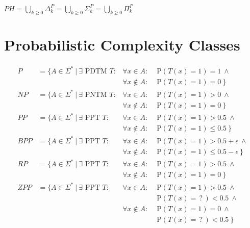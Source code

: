 \documentclass[
    13pt,
    oneside,
    a4paper,
    numbers=enddot,
    abstractoff,
    parskip=full
]{scrreprt}
\begin{document}
$ PH = \bigcup_{k \geq 0} \Delta^P_{k}
     = \bigcup_{k \geq 0} \Sigma^P_{k}
     = \bigcup_{k \geq 0} \Pi^P_{k} $




\section*{Probabilistic Complexity Classes}
\label{sec:probabilistic_complexity_classes}


\begin{align*}
    P & = \{
    A \in \Sigma^\ast ~|~
    \exists \text{ PDTM } T:
    & \forall x \in A:      & \text{ P}(T(x)=1) = 1 ~\land \\
    & & \forall x \notin A: & \text{ P}(T(x)=1) = 0 ~\}
    \\
    NP & = \{
    A \in \Sigma^\ast ~|~
    \exists \text{ PNTM } T:
    & \forall x \in A:      & \text{ P}(T(x)=1) > 0 ~\land \\
    & & \forall x \notin A: & \text{ P}(T(x)=1) = 0 ~\}
    \\
    PP & = \{
    A \in \Sigma^\ast ~|~
    \exists \text{ PPT } T:
    & \forall x \in A:      & \text{ P}(T(x)=1) > 0.5 ~\land \\
    & & \forall x \notin A: & \text{ P}(T(x)=1) \leq 0.5 ~\}
    \\
    BPP & = \{
    A \in \Sigma^\ast ~|~
    \exists \text{ PPT } T:
    & \forall x \in A:      & \text{ P}(T(x)=1) > 0.5 + \epsilon ~\land \\
    & & \forall x \notin A: & \text{ P}(T(x)=1) \leq 0.5 - \epsilon ~\}
    \\
    RP & = \{
    A \in \Sigma^\ast ~|~
    \exists \text{ PPT } T:
    & \forall x \in A:      & \text{ P}(T(x)=1) > 0.5 ~\land \\
    & & \forall x \notin A: & \text{ P}(T(x)=1) = 0 ~\}
    \\
    ZPP & = \{
    A \in \Sigma^\ast ~|~
    \exists \text{ PPT } T:
    & \forall x \in A:      & \text{ P}(T(x)=1) > 0.5 ~\land \\
    & &                     & \text{ P}(T(x)=\,?\,) < 0.5 ~\land \\
    & & \forall x \notin A: & \text{ P}(T(x)=1) = 0 ~\land \\
    & &                     & \text{ P}(T(x)=\,?\,) < 0.5 ~\}
\end{align*}
\end{document}

